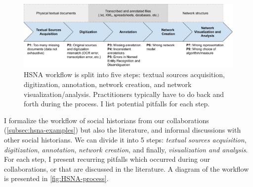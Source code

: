 \begin{figure}
    \includegraphics[origin=c, width=\textwidth]{static/figures/HSNAProcess/process.pdf}
    \caption{HSNA workflow is split into five steps: textual sources acquisition, digitization, annotation, network creation, and network visualization/analysis. Practitioners typically have to do back and forth during the process. I list potential pitfalls for each step.}
    \label{fig:HSNA-process}
\end{figure}


I formalize the \hsna workflow of social historians from our collaborations (\autoref{subsec:hsna-examples}) but also the literature, and informal discussions with other social historians.
We can divide it into 5 steps: \textit{textual sources acquisition}, \textit{digitization}, \textit{annotation}, \textit{network creation}, and finally, \textit{visualization and analysis}.
For each step, I present recurring pitfalls which occurred during our collaborations, or that are discussed in the literature\cite{diesnerImpactEntityDisambiguation2015, cristofoliAuxSourcesGrands2008, lemercierAnalyseReseauxHistoire2005}.
A diagram of the workflow is presented in \autoref{fig:HSNA-process}.

